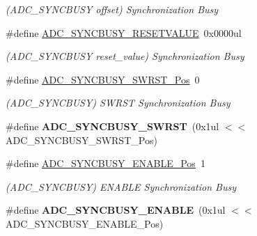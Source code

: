 \begin{DoxyCompactItemize}
\begin{DoxyCompactList}\small\item\em (A\+D\+C\+\_\+\+S\+Y\+N\+C\+B\+U\+S\+Y offset) Synchronization Busy \end{DoxyCompactList}\item 
\hypertarget{group___s_a_m_l21___a_d_c_ga92a4b3b998d1e505c1c2a5471d7baebf}{}\#define \hyperlink{group___s_a_m_l21___a_d_c_ga92a4b3b998d1e505c1c2a5471d7baebf}{A\+D\+C\+\_\+\+S\+Y\+N\+C\+B\+U\+S\+Y\+\_\+\+R\+E\+S\+E\+T\+V\+A\+L\+U\+E}~0x0000ul\label{group___s_a_m_l21___a_d_c_ga92a4b3b998d1e505c1c2a5471d7baebf}

\begin{DoxyCompactList}\small\item\em (A\+D\+C\+\_\+\+S\+Y\+N\+C\+B\+U\+S\+Y reset\+\_\+value) Synchronization Busy \end{DoxyCompactList}\item 
\hypertarget{group___s_a_m_l21___a_d_c_ga23c4a8c88c12b7f527fabc3247556fc9}{}\#define \hyperlink{group___s_a_m_l21___a_d_c_ga23c4a8c88c12b7f527fabc3247556fc9}{A\+D\+C\+\_\+\+S\+Y\+N\+C\+B\+U\+S\+Y\+\_\+\+S\+W\+R\+S\+T\+\_\+\+Pos}~0\label{group___s_a_m_l21___a_d_c_ga23c4a8c88c12b7f527fabc3247556fc9}

\begin{DoxyCompactList}\small\item\em (A\+D\+C\+\_\+\+S\+Y\+N\+C\+B\+U\+S\+Y) S\+W\+R\+S\+T Synchronization Busy \end{DoxyCompactList}\item 
\hypertarget{group___s_a_m_l21___a_d_c_ga2729ca71883a384555f3bae80b686c80}{}\#define {\bfseries A\+D\+C\+\_\+\+S\+Y\+N\+C\+B\+U\+S\+Y\+\_\+\+S\+W\+R\+S\+T}~(0x1ul $<$$<$ A\+D\+C\+\_\+\+S\+Y\+N\+C\+B\+U\+S\+Y\+\_\+\+S\+W\+R\+S\+T\+\_\+\+Pos)\label{group___s_a_m_l21___a_d_c_ga2729ca71883a384555f3bae80b686c80}

\item 
\hypertarget{group___s_a_m_l21___a_d_c_ga4c2fa17f8421db2f1a40c2c68395f3a4}{}\#define \hyperlink{group___s_a_m_l21___a_d_c_ga4c2fa17f8421db2f1a40c2c68395f3a4}{A\+D\+C\+\_\+\+S\+Y\+N\+C\+B\+U\+S\+Y\+\_\+\+E\+N\+A\+B\+L\+E\+\_\+\+Pos}~1\label{group___s_a_m_l21___a_d_c_ga4c2fa17f8421db2f1a40c2c68395f3a4}

\begin{DoxyCompactList}\small\item\em (A\+D\+C\+\_\+\+S\+Y\+N\+C\+B\+U\+S\+Y) E\+N\+A\+B\+L\+E Synchronization Busy \end{DoxyCompactList}\item 
\hypertarget{group___s_a_m_l21___a_d_c_ga2e0acdca971bc71818b609906af93408}{}\#define {\bfseries A\+D\+C\+\_\+\+S\+Y\+N\+C\+B\+U\+S\+Y\+\_\+\+E\+N\+A\+B\+L\+E}~(0x1ul $<$$<$ A\+D\+C\+\_\+\+S\+Y\+N\+C\+B\+U\+S\+Y\+\_\+\+E\+N\+A\+B\+L\+E\+\_\+\+Pos)\label{group___s_a_m_l21___a_d_c_ga2e0acdca971bc71818b609906af93408}


\end{DoxyCompactItemize}
